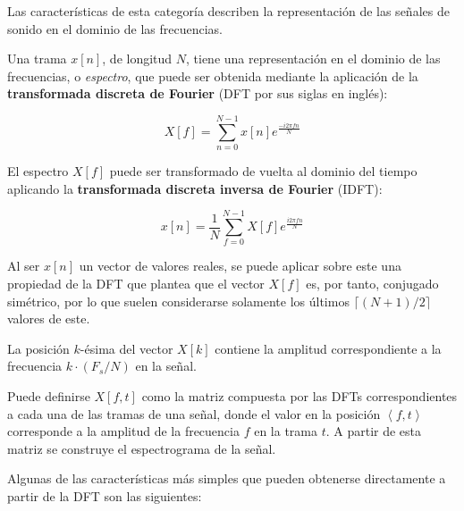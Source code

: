 Las características de esta categoría describen la representación de las señales de sonido en el dominio de las frecuencias.

Una trama $x[n]$, de longitud $N$, tiene una representación en el dominio de las frecuencias, o \textit{espectro}, que puede ser obtenida mediante la aplicación de la \textbf{transformada discreta de Fourier} (DFT por sus siglas en inglés):

\begin{equation}
    \label{eq:DFT}
    X[f] = \sum_{n=0}^{N-1}{x[n]e^{\frac{-i2\pi fn}{N}}}
\end{equation}

El espectro $X[f]$ puede ser transformado de vuelta al dominio del tiempo aplicando la \textbf{transformada discreta inversa de Fourier} (IDFT):

\begin{equation}
    \label{eq:IDFT}
    x[n] = \frac{1}{N}\sum_{f=0}^{N-1}{X[f]e^{\frac{i2\pi fn}{N}}}
\end{equation}

Al ser $x[n]$ un vector de valores reales, se puede aplicar sobre este una propiedad de la DFT que plantea que el vector $X[f]$ es, por tanto, conjugado simétrico, por lo que suelen considerarse solamente los últimos $\lceil (N+1)/2 \rceil$ valores de este.

La posición $k$-ésima del vector $X[k]$ contiene la amplitud correspondiente a la frecuencia $k\cdot(F_s/N)$ en la señal.

Puede definirse $X[f,t]$ como la matriz compuesta por las DFTs correspondientes a cada una de las tramas de una señal, donde el valor en la posición $\left<f, t\right>$ corresponde a la amplitud de la frecuencia $f$ en la trama $t$.
A partir de esta matriz se construye el espectrograma de la señal.

Algunas de las características más simples que pueden obtenerse directamente a partir de la DFT son las siguientes:

